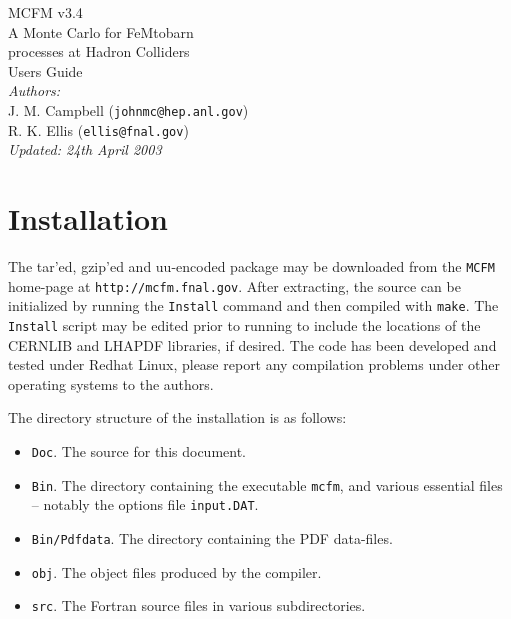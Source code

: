 \documentclass[12pt]{article}
\begin{document}
\def\GeV{\mbox{GeV}}

\thispagestyle{empty}
\vspace*{3cm}
\begin{center}
{\Huge MCFM v3.4} \\
\vspace*{0.5cm}
\Large{A Monte Carlo for FeMtobarn} \\
\Large{processes at Hadron Colliders} \\
\vspace*{2cm}
{\huge Users Guide} \\
\vspace*{4cm}
{\it Authors:} \\
\vspace*{0.2cm}
J. M. Campbell ({\tt johnmc@hep.anl.gov}) \\
R. K. Ellis ({\tt ellis@fnal.gov}) \\
\vspace*{2.5cm}
{\it \small Updated: 24th April 2003}
\end{center}

\newpage

\section{Installation}

The tar'ed, gzip'ed and uu-encoded package may be downloaded from
the {\tt MCFM} home-page at {\tt http://mcfm.fnal.gov}.
After extracting, the source can be initialized by running the
{\tt Install} command and then compiled with {\tt make}. The
{\tt Install} script may be edited prior to running to include
the locations of the CERNLIB and LHAPDF libraries, if desired.
The code has been developed and tested under Redhat Linux, please report
any compilation problems under other operating systems to the authors.

The directory structure of the installation is as follows:
\begin{itemize}
\item {\tt Doc}. The source for this document.
\item {\tt Bin}. The directory containing the executable {\tt mcfm},
and various essential files -- notably the options file {\tt input.DAT}.
\item {\tt Bin/Pdfdata}. The directory containing the PDF data-files.
\item {\tt obj}. The object files produced by the compiler. 
\item {\tt src}. The Fortran source files in various subdirectories.
\end{itemize}
\end{document}
